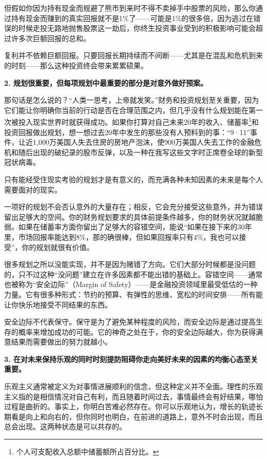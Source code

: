 但假如你因为持有现金而规避了熊市到来时不得不卖掉手中股票的风险，那么你通过持有现金而赚到的真实回报就不是1\%了——可能是1\%的很多倍，因为逃过在错误的时候走投无路地抛售股票这一劫后，你终生投资事业受到的积极影响可能会超过许多次巨额回报的总和。

复利并不依赖巨额回报。只要回报长期持续而不间断——尤其是在混乱和危机到来的时刻——那么这种投资终会带来累累硕果。

\textbf{2. 规划很重要，但每项规划中最重要的部分是对意外做好预案。}

那句话是怎么说的？“人类一思考，上帝就发笑。”财务和投资规划至关重要，因为它们能让你明确你当前的行动是否在合理范围之内，但几乎没有什么规划能在第一次被投入现实世界时就获得成功。如果你打算对自己未来20年的收入、储蓄率\footnote{个人可支配收入总额中储蓄额所占百分比。}和投资回报做出规划，想一想过去20年中发生的那些没有人预料到的事：“9·11”事件，让近1,000万美国人失去住房的房地产泡沫，使900万美国人失去工作的金融危机和随后出现的破纪录的股市反弹，以及一种在我写这些文字时正席卷全球的新型冠状病毒。

只有能经受住现实考验的规划才是有意义的，而充满各种未知因素的未来是每个人需要面对的现实。

一项好的规划不会否认意外的大量存在；相反，它会充分接受这些意外，并为错误留出足够大的空间。你的财务规划要求的具体前提条件越多，你的财务状况就越脆弱。如果在储蓄率方面你留出了足够大的容错空间，能说“如果在接下来的30年里，市场回报率能达到8\%，那的确很棒，但如果回报率只有4\%，我也可以接受”，你的规划就很有价值。

很多规划之所以没能实现，并不是因为赌错了方向。它们大部分时候都是没问题的，只不过这种“没问题”建立在许多因素都不能出错的基础上。容错空间——通常也被称为“安全边际”（Margin of Safety）——是金融投资领域里最受低估的一种力量。它有很多种形式：节约的预算、有弹性的思维、宽松的时间安排——所有能让你快乐地接受不同结果的东西。

安全边际不代表保守。保守是为了避免某种程度的风险，而安全边际是通过提高生存的概率来增加成功的可能。它的神奇之处在于，你的安全边际越大，你为获得满意结果而需要做出的努力就越小。

\textbf{3. 在对未来保持乐观的同时时刻提防阻碍你走向美好未来的因素的均衡心态至关重要。}

乐观主义通常被定义为对事情进展顺利的信念，但这种定义并不全面。理性的乐观主义指的是相信情况对自己有利，而且随着时间过去，事情最终会有好结果，哪怕过程是曲折的。事实上，你明白苦难必然存在。你可以乐观地认为，增长的轨迹长期看是向上和向右的，但你同时也明白，在前进的道路上，意外不时会出现，而且总会出现。这两种状态是可以共存的。

